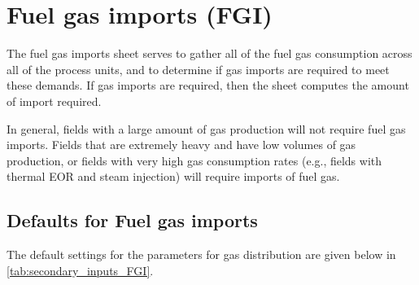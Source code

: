 \documentclass[11pt]{report}
\begin{document}
\clearpage

\section{Fuel gas imports (FGI)}
 \label{sec:FuelGasInputs}

The fuel gas imports sheet serves to gather all of the fuel gas consumption across all of the process units, and to determine if gas imports are required to meet these demands. If gas imports are required, then the sheet computes the amount of import required.

In general, fields with a large amount of gas production will not require fuel gas imports. Fields that are extremely heavy and have low volumes of gas production, or fields with very high gas consumption rates (e.g., fields with thermal EOR and steam injection) will require imports of fuel gas.

\subsection{Defaults for Fuel gas imports}

The default settings for the parameters for gas distribution are given below in \ref{tab:secondary_inputs_FGI}.

\clearpage
\end{document}

